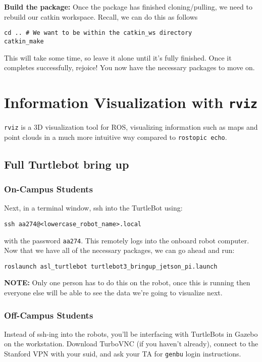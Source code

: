 \documentclass{article}
\begin{document}
{\bf Build the package:}
Once the package has finished cloning/pulling, we need to rebuild our catkin workspace. Recall, we can do this as follows
\begin{lstlisting}
cd .. # We want to be within the catkin_ws directory
catkin_make
\end{lstlisting}

This will take some time, so leave it alone until it's fully finished. Once it completes successfully, rejoice! You now have the necessary packages to move on.

\section{Information Visualization with \texttt{rviz}}

\texttt{rviz} is a 3D visualization tool for ROS, visualizing information such as maps and point clouds in a much more intuitive way compared to \texttt{rostopic echo}.

\subsection{Full Turtlebot bring up}

\subsubsection{On-Campus Students}

Next, in a terminal window, ssh into the TurtleBot using:
\begin{lstlisting}
ssh aa274@<lowercase_robot_name>.local
\end{lstlisting}
with the password \texttt{aa274}. This remotely logs into the onboard robot computer. Now that we have all of the necessary packages, we can go ahead and run:
\begin{lstlisting}
roslaunch asl_turtlebot turtlebot3_bringup_jetson_pi.launch
\end{lstlisting}
{\bf NOTE:} Only one person has to do this on the robot, once this is running then everyone else will be able to see the data we're going to visualize next.

\subsubsection{Off-Campus Students}
Instead of ssh-ing into the robots, you'll be interfacing with TurtleBots in Gazebo on the workstation. Download TurboVNC (if you haven't already), connect to the Stanford VPN with your suid, and ask your TA for \texttt{genbu} login instructions.
\end{document}
